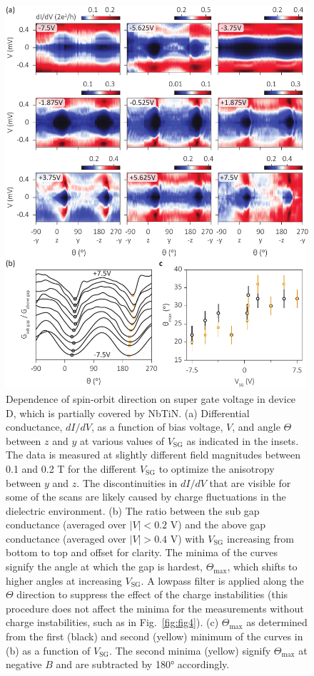 \begin{figure}
\begin{center}
\centering
\includegraphics[width=0.7\columnwidth]{chapter_spinorbit/figures/SFig5_SGdep_half_updated.pdf}
\caption{\label{fig:SGdep}
Dependence of spin-orbit direction on super gate voltage in device D, which is partially covered by NbTiN.
(a) Differential conductance, $dI/dV$, as a function of bias voltage, $V$, and angle $\Theta$ between $z$ and $y$ at various values of $V_{\mathrm{SG}}$ as indicated in the insets.
The data is measured at slightly different field magnitudes between 0.1 and 0.2 T for the different $V_{\mathrm{SG}}$ to optimize the anisotropy between $y$ and $z$.
The discontinuities in $dI/dV$ that are visible for some of the scans are likely caused by charge fluctuations in the dielectric environment.
(b) The ratio between the sub gap conductance (averaged over $|V| < 0.2$ V) and the above gap conductance (averaged over $|V| > 0.4$ V) with $V_{\mathrm{SG}}$ increasing from bottom to top and offset for clarity.
The minima of the curves signify the angle at which the gap is hardest, $\Theta_{\mathrm{max}}$, which shifts to higher angles at increasing $V_{\mathrm{SG}}$.
A lowpass filter is applied along the $\Theta$ direction to suppress the effect of the charge instabilities (this procedure does not affect the minima for the measurements without charge instabilities, such as in Fig.~\ref{fig:fig4}).
(c) $\Theta_{\mathrm{max}}$ as determined from the first (black) and second (yellow) minimum of the curves in (b) as a function of $V_{\mathrm{SG}}$.
The second minima (yellow) signify $\Theta_{\mathrm{max}}$ at negative $B$ and are subtracted by \ang{180} accordingly.
}
\end{center}
\end{figure}

